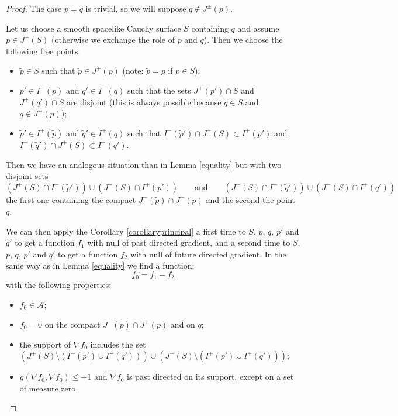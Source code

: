 \documentclass[11pt]{article}
\newcommand{\parenthese}[1]{\left( {#1} \right)}
\begin{document}
\begin{proof}
The case $p=q$ is trivial, so we will suppose $q\notin J^{\pm}(p)$.

Let us choose a smooth spacelike Cauchy surface $S$ containing $q$ and assume $p \in J^-(S)$ (otherwise we exchange the role of $p$ and $q$). Then we choose the following free points:
\begin{itemize}\itemsep=0pt
\item $\tilde p \in S$ such that $\tilde p \in J^+(p)$ (note: $\tilde p = p$ if $p\in S$);
\item $p' \in I^-(p)$ and $q' \in I^-(q)$ such that the sets $J^+(p') \cap S$ and $J^+(q') \cap S$ are disjoint (this is always possible because $q\in S$ and $q\notin J^{+}(p)$);
\item $\tilde p' \in I^+(\tilde p)$ and $\tilde q' \in I^+(q)$ such that $I^-(\tilde p') \cap J^+(S) \subset I^+(p')$ and $I^-(\tilde q') \cap J^+(S) \subset I^+(q')$.
\end{itemize}
Then we have an analogous situation than in Lemma \ref{equality} but with two disjoint sets
\[
\parenthese{J^+(S) \cap I^-(\tilde p')} \cup  \parenthese{J^-(S) \cap I^+(p')}\qquad\text{and}\qquad\parenthese{J^+(S) \cap I^-(\tilde q')} \cup  \parenthese{J^-(S) \cap I^+(q')}
\]
the f\/irst one containing the compact $J^-(\tilde p) \cap J^+(p)$ and the second the point $q$.

We can then apply the Corollary \ref{corollaryprincipal} a f\/irst time to $S$, $\tilde p$, $q$, $\tilde p'$ and $\tilde q'$ to get a function $f_1$ with null of past directed gradient, and a second time to $S$, $p$, $q$, $p'$ and $q'$ to get a function $f_2$ with null of future directed gradient. In the same way as in Lemma \ref{equality} we f\/ind a function:
\[
f_0 = f_1 - f_2
\]
with the following properties:
\begin{itemize}\itemsep=0pt
\item $f_0\in\mathcal A$;
\item $f_0 = 0$ on the compact $J^-(\tilde p) \cap J^+(p)$ and on $q$;
\item the support of $\nabla f_0$ includes the set $\parenthese{J^+(S) \!\setminus \! \parenthese{I^-(\tilde p') \cup I^-(\tilde q')}} \cup    \parenthese{J^-(S)\! \setminus \!\parenthese{I^+(p') \cup I^+(q') }}$;
\item $g( \nabla f_0, \nabla f_0) \leq -1$ and $\nabla f_0$ is past directed on its support, except on a set of measure zero.
\end{itemize}


\end{proof}
\end{document}
